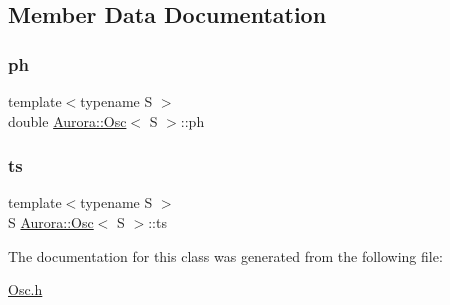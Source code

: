 \subsection{Member Data Documentation}
\mbox{\label{class_aurora_1_1_osc_ac649d41b585b377b17eeba66a18dbcc2}} 
\subsubsection{\texorpdfstring{ph}{ph}}
{\footnotesize\ttfamily template$<$typename S $>$ \\
double \hyperlink{class_aurora_1_1_osc}{Aurora\+::\+Osc}$<$ S $>$\+::ph\hspace{0.3cm}{\ttfamily [protected]}}

\mbox{\label{class_aurora_1_1_osc_a2c7ae380eade4eee2e6035856ed0dcbe}} 
\subsubsection{\texorpdfstring{ts}{ts}}
{\footnotesize\ttfamily template$<$typename S $>$ \\
S \hyperlink{class_aurora_1_1_osc}{Aurora\+::\+Osc}$<$ S $>$\+::ts\hspace{0.3cm}{\ttfamily [protected]}}



The documentation for this class was generated from the following file\+:\begin{DoxyCompactItemize}
\item 
\hyperlink{_osc_8h}{Osc.\+h}\end{DoxyCompactItemize}
